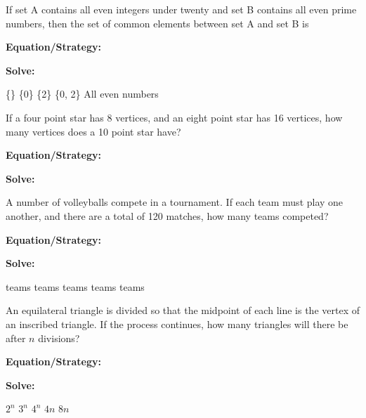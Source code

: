 \vfill
\newpage
\begin{multicols*}{2}
\begin{outline}[enumerate]
\medium

\1 If set A contains all even integers under twenty and set B contains all even prime numbers, then the set of common elements between set A and set B is

\bigskip
\textbf{Equation/Strategy:} \hrulefill

\bigskip
\textbf{Solve:}

\vfill
\2 \{\}
\2 \{0\}
\2 \{2\}
\2 \{0, 2\}
\2 All even numbers

\midline

\1 If a four point star has 8 vertices, and an eight point star has 16 vertices, how many vertices does a 10 point star have?

\bigskip
\textbf{Equation/Strategy:} \hrulefill

\bigskip
\textbf{Solve:}

\vfill
{}

\columnbreak
\advanced

\1 A number of volleyballs compete in a tournament. If each team must play one another, and there are a total of 120 matches, how many teams competed?

\bigskip
\textbf{Equation/Strategy:} \hrulefill

\bigskip
\textbf{Solve:}

\vfill
{} teams
 teams
 teams
 teams
 teams

\midline

\1 An equilateral triangle is divided so that the midpoint of each line is the vertex of an inscribed triangle. If the process continues, how many triangles will there be after $n$ divisions?

\bigskip
\textbf{Equation/Strategy:} \hrulefill

\bigskip
\textbf{Solve:}

\vfill
\2 $2^n$
\2 $3^n$
\2 $4^n$
\2 $4n$
\2 $8n$
\end{outline}
\end{multicols*}